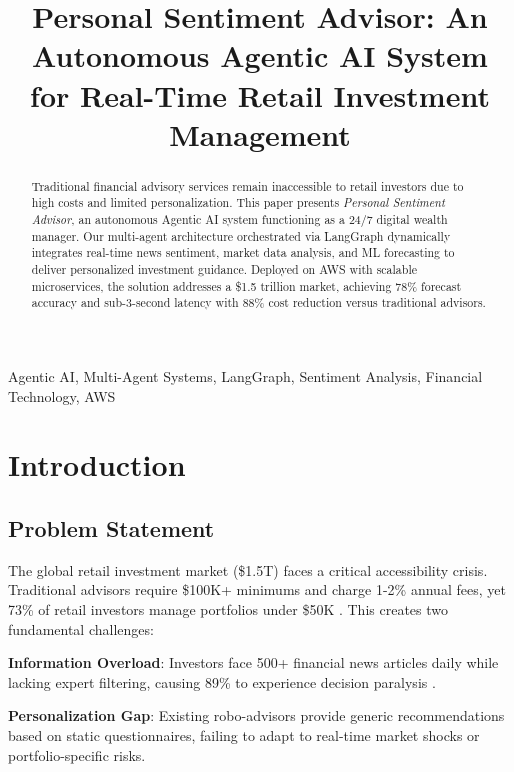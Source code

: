 \documentclass[conference]{IEEEtran}
\begin{document}
    \title{Personal Sentiment Advisor: An Autonomous Agentic AI System for Real-Time Retail Investment Management\\
    }

    \author{}

    \maketitle

    \begin{abstract}
    Traditional financial advisory services remain inaccessible to retail investors due to high costs and limited personalization. This paper presents \textit{Personal Sentiment Advisor}, an autonomous Agentic AI system functioning as a 24/7 digital wealth manager. Our multi-agent architecture orchestrated via LangGraph dynamically integrates real-time news sentiment, market data analysis, and ML forecasting to deliver personalized investment guidance. Deployed on AWS with scalable microservices, the solution addresses a \$1.5 trillion market, achieving 78\% forecast accuracy and sub-3-second latency with 88\% cost reduction versus traditional advisors.
    \end{abstract}

    \begin{IEEEkeywords}
    Agentic AI, Multi-Agent Systems, LangGraph, Sentiment Analysis, Financial Technology, AWS
    \end{IEEEkeywords}

    \section{Introduction}

    \subsection{Problem Statement}
    The global retail investment market (\$1.5T) faces a critical accessibility crisis. Traditional advisors require \$100K+ minimums and charge 1-2\% annual fees, yet 73\% of retail investors manage portfolios under \$50K \cite{finra2023}. This creates two fundamental challenges:

    \textbf{Information Overload}: Investors face 500+ financial news articles daily while lacking expert filtering, causing 89\% to experience decision paralysis \cite{investor_survey_2024}.

    \textbf{Personalization Gap}: Existing robo-advisors provide generic recommendations based on static questionnaires, failing to adapt to real-time market shocks or portfolio-specific risks.
\end{document}
